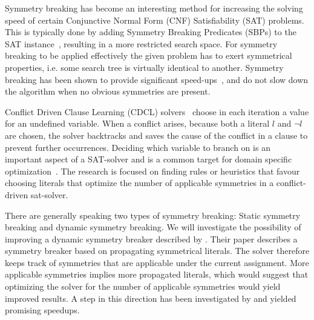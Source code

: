 Symmetry breaking has become an interesting method for increasing the solving speed of
certain Conjunctive Normal Form (CNF) Satisfiability (SAT) problems.
This is typically done by adding Symmetry Breaking Predicates (SBPs) to the SAT
instance~\cite{sakallah2009symmetry}, resulting in a more restricted search space.
For symmetry breaking to be applied effectively the given problem has to exert symmetrical
properties, i.e. some search tree is virtually identical to another.
Symmetry breaking has been shown to provide significant
speed-ups~\cite{darga2004exploiting,aloul2003solving}, and do not slow down the algorithm
when no obvious symmetries are present.

Conflict Driven Clause Learning (CDCL) solvers~\cite{marques1999grasp} choose in each iteration a value for an undefined variable.
When a conflict arises, because both a literal $l$ and $\neg l$ are chosen, the solver backtracks
and saves the cause of the conflict in a clause to prevent further occurrences.
Deciding which variable to branch on is an important aspect of a SAT-solver and is a common target
for domain specific optimization~\cite{een2004extensible}.
The research is focused on finding rules or heuristics that favour choosing literals
that optimize the number of applicable symmetries in a conflict-driven sat-solver.

There are generally speaking two types of symmetry breaking: Static symmetry breaking and
dynamic symmetry breaking.
We will investigate the possibility of improving a dynamic symmetry breaker described by
\cite{devriendt2012symmetry}.
Their paper describes a symmetry breaker based on propagating symmetrical literals.
The solver therefore keeps track of symmetries that are applicable under the current assignment.
More applicable symmetries implies more propagated literals, which would suggest that
optimizing the solver for the number of applicable symmetries would yield improved results.
A step in this direction has been investigated by \cite{devriendt2012symmetry} and yielded
promising speedups.
